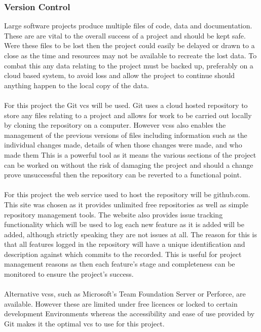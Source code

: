 		\subsubsection{Version Control}
			Large software projects produce multiple files of code, data and documentation. These are  are vital to the overall success of a project and should  be kept safe. Were these files to be lost then the project could easily be delayed or drawn to a close as the time and resources may not be available to recreate the lost data. To combat this any data relating to the project must be backed up, preferably on a cloud based system, to avoid loss and allow the project to continue should anything happen to the local copy of the data.
			\\\\
			For this project the Git \gls{vcs} will be used. Git  uses  a cloud hosted repository to store any files relating to a project and allows for work to be carried out locally by cloning the repository on a computer. However \glspl{vcs} also enables the management of the previous versions of files including information such as the individual changes made, details of when those changes were made, and who made them This is a powerful tool as it means the various sections of the project can be worked on without the risk of damaging the project and should  a change prove unsuccessful then the repository can be reverted to a functional point.
			\\\\
			For this project the web service used to host the repository will be github.com. This site was chosen as it provides unlimited free repositories as well as simple repository management tools. The website also provides issue tracking functionality which will be used to log each new feature as it is added will be added, although strictly speaking  they are not issues at all. The reason for this is that all features logged in the repository will have a unique identification and description against which commits to the recorded. This is useful for project management reasons as then each feature’s stage and completeness can be monitored to ensure the project’s success.
			\\\\
			Alternative \glspl{vcs}, such as Microsoft’s Team Foundation Server or Perforce,  are available. However these are limited under free licences or locked to certain development Environments whereas the accessibility and ease of use provided by Git makes it the optimal \gls{vcs} to use for this project.
